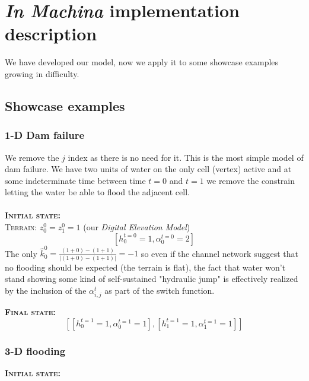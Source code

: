\documentclass[%
 reprint,
 amsmath,amssymb,
 aps,
]{revtex4-2}
\begin{document}
\section{\label{sec:level4}\textit{In Machina} implementation description}

We have developed our model, now we apply it to some showcase examples growing in difficulty.

\subsection{\label{sec:level4}Showcase examples}

\subsubsection{\label{sec:level1}\textbf{1-D Dam failure}}

We remove the $j$ index as there is no need for it. This is the most simple model of dam failure. We have two units of water on the only cell (vertex) active and at some indeterminate time between time $t = 0$ and $t = 1$ we remove the constrain letting the water be able to flood the adjacent cell.\\
\\
\textsc{\textbf{Initial state:}}\\
\textsc{Terrain:}  $z_0^0 = z_1^0 = 1$ (our \textit{Digital Elevation Model})\\
\begin{equation}
    \left[h_0^{t=0} = 1, \alpha_0^{t=0} = 2\right]
\end{equation}
The only $\hat{k}_0^0 = \frac{(1+0) - (1+1)}{|(1+0)-(1+1)|}=-1$ so even if the channel network suggest that no flooding should be expected (the terrain is flat), the fact that water won't stand showing some kind of self-sustained "hydraulic jump" is effectively realized by the inclusion of the $\alpha_{i,j}^t$ as part of the switch function.

\textsc{\textbf{Final state:}}
\begin{equation}
    \left[\left[h_0^{t=1}=1, \alpha_0^{t=1} = 1\right], \left[h_1^{t=1}=1, \alpha_1^{t=1} = 1\right]\right]
\end{equation}

\subsubsection{\label{sec:level2}\textbf{3-D flooding}}
\textsc{\textbf{Initial state:}}
\end{document}

